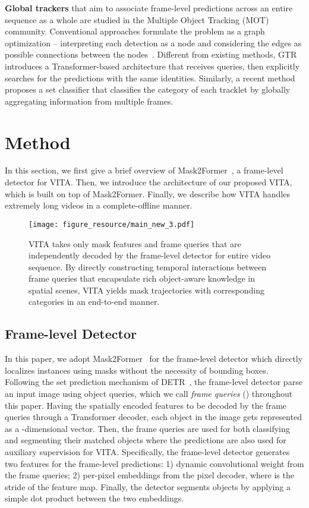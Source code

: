 \documentclass{article}
\begin{document}
\textbf{Global trackers} that aim to associate frame-level predictions across an entire sequence as a whole are studied in the Multiple Object Tracking (MOT) community.
Conventional approaches formulate the problem as a graph optimization -- interpreting each detection as a node and considering the edges as possible connections between the nodes~\cite{zhang2008global, Lif_T, MPN, LPC}.
Different from existing methods, GTR~\cite{GTR} introduces a Transformer-based architecture that receives queries, then explicitly searches for the predictions with the same identities.
Similarly, a recent method~\cite{SetClassifier} proposes a set classifier that classifies the category of each tracklet by globally aggregating information from multiple frames. \section{Method}
\label{sec:methods}
In this section, we first give a brief overview of Mask2Former~\cite{Mask2Former}, a frame-level detector for VITA.
Then, we introduce the architecture of our proposed VITA, which is built on top of Mask2Former.
Finally, we describe how VITA handles extremely long videos in a complete-offline manner. \begin{figure}
  \centering
  \texttt{[image: figure\_resource/main\_new\_3.pdf]}
\caption{
VITA takes only mask features and frame queries that are independently decoded by the frame-level detector for entire video sequence.
  By directly constructing temporal interactions between frame queries that encapsulate rich object-aware knowledge in spatial scenes, VITA yields mask trajectories with corresponding categories in an end-to-end manner.
  }
  \label{fig:main}
\end{figure}
 
\subsection{Frame-level Detector}
\label{sec:framedetector}
In this paper, we adopt Mask2Former~\cite{Mask2Former} for the frame-level detector which directly localizes instances using masks without the necessity of bounding boxes.
Following the set prediction mechanism of DETR~\cite{DETR}, the frame-level detector parse an input image  using  object queries, which we call \textit{frame queries} () throughout this paper.
Having the spatially encoded features to be decoded by the frame queries through a Transformer decoder, each object in the image gets represented as a -dimensional vector.
Then, the frame queries are used for both classifying and segmenting their matched objects where the predictions are also used for auxiliary supervision for VITA.
Specifically, the frame-level detector generates two features for the frame-level predictions: 1) dynamic  convolutional weight from the frame queries; 2) per-pixel embeddings  from the pixel decoder, where  is the stride of the feature map.
Finally, the detector segments objects by applying a simple dot product between the two embeddings.
\end{document}
